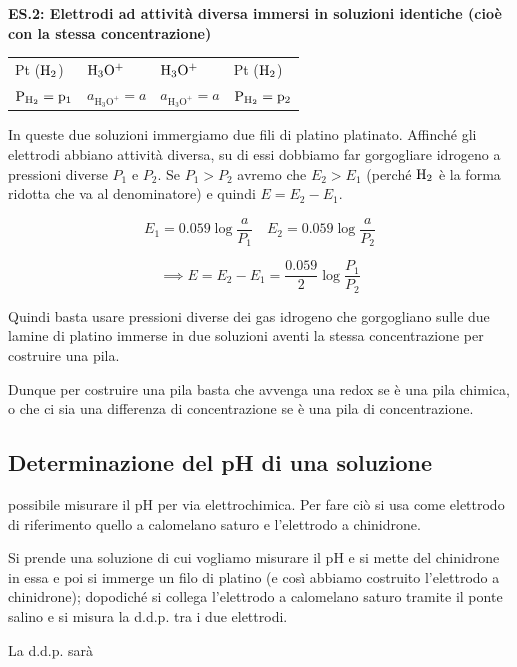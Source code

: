 \vspace{0.2cm}\textbf{ES.2: Elettrodi ad attività diversa immersi in soluzioni identiche (cioè con la stessa concentrazione)}

\begin{center}
    \begin{tabular}{p{1.8cm}|p{2cm}||p{2cm}|p{2cm}}
        Pt ($\rm H_2$) & $\rm H_3O^+$ & $\rm H_3O^+$ & Pt ($\rm H_2$)\\[0.5ex]
        $\rm P_{H_2} = p_1$ & $a_{\text{H}_3\text{O}^+}=a$ & $a_{\text{H}_3\text{O}^+}=a$ & $\rm P_{H_2} = p_2$\\[0.5ex]
    \end{tabular}
\end{center}

In queste due soluzioni immergiamo due fili di platino platinato. Affinché gli elettrodi abbiano attività diversa, su di essi dobbiamo far gorgogliare idrogeno a pressioni diverse $P_1$ e $P_2$. Se $P_1>P_2$ avremo che $E_2>E_1$ (perché $\rm H_2$ è la forma ridotta che va al denominatore) e quindi $E= E_2 - E_1$. 

$$E_1 = 0.059 \log \frac{a}{P_1} \quad E_2 = 0.059 \log \frac{a}{P_2}$$

$$\implies E = E_2 - E_1 = \frac{0.059}{2} \log \frac{P_1}{P_2}$$

Quindi basta usare pressioni diverse dei gas idrogeno che gorgogliano sulle due lamine di platino immerse in due soluzioni aventi la stessa concentrazione per costruire una pila.

\vspace{0.2cm}Dunque per costruire una pila basta che avvenga una redox se è una pila chimica, o che ci sia una differenza di concentrazione se è una pila di concentrazione.
\subsection{Determinazione del pH di una soluzione}

\E possibile misurare il pH per via elettrochimica. Per fare ciò si usa come elettrodo di riferimento quello a calomelano saturo e l'elettrodo a chinidrone.

Si prende una soluzione di cui vogliamo misurare il pH e si mette del chinidrone in essa e poi si immerge un filo di platino (e così abbiamo costruito l'elettrodo a chinidrone); dopodiché si collega l'elettrodo a calomelano saturo tramite il ponte salino e si misura la d.d.p. tra i due elettrodi. 

La d.d.p. sarà

